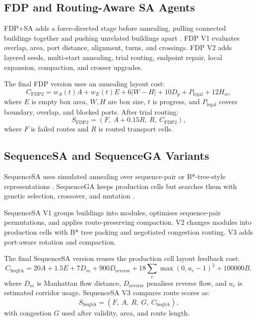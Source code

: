 \documentclass[11pt,a4paper]{article}
\begin{document}
\subsection{FDP and Routing-Aware SA Agents}

FDP+SA adds a force-directed stage before annealing, pulling connected buildings together and pushing unrelated buildings apart \cite{eades1984heuristic}. FDP V1 evaluates overlap, area, port distance, alignment, turns, and crossings. FDP V2 adds layered seeds, multi-start annealing, trial routing, endpoint repair, local expansion, compaction, and crosser upgrades.

The final FDP version uses an annealing layout cost:
\begin{equation}
C_{\mathrm{FDP2}} = w_A(t)A + w_E(t)E + 6|W-H| + 10D_p + P_{\mathrm{legal}} + 12H_{io},
\end{equation}
where $E$ is empty box area, $W,H$ are box size, $t$ is progress, and $P_{\mathrm{legal}}$ covers boundary, overlap, and blocked ports. After trial routing:
\begin{equation}
S_{\mathrm{FDP2}} = \left(F,\ A+0.15R,\ R,\ C_{\mathrm{FDP2}}\right),
\end{equation}
where $F$ is failed routes and $R$ is routed transport cells.

\subsection{SequenceSA and SequenceGA Variants}

SequenceSA uses simulated annealing over sequence-pair or B*-tree-style representations \cite{chang2000bstar}. SequenceGA keeps production cells but searches them with genetic selection, crossover, and mutation \cite{goldberg1989genetic}.

SequenceSA V1 groups buildings into modules, optimises sequence-pair permutations, and applies route-preserving compaction. V2 changes modules into production cells with B* tree packing and negotiated congestion routing. V3 adds port-aware rotation and compaction.

The final SequenceSA version reuses the production cell layout feedback cost:
\begin{equation}
C_{\mathrm{SeqSA}} = 20A + 1.5E + 7D_m + 900D_{\mathrm{reverse}}
 + 18\sum_{c}\max(0,u_c-1)^2 + 100000B,
\end{equation}
where $D_m$ is Manhattan flow distance, $D_{\mathrm{reverse}}$ penalises reverse flow, and $u_c$ is estimated corridor usage. SequenceSA V3 compares route scores as:
\begin{equation}
S_{\mathrm{SeqSA}} = \left(F,\ A,\ R,\ G,\ C_{\mathrm{SeqSA}}\right),
\end{equation}
with congestion $G$ used after validity, area, and route length.
\end{document}
